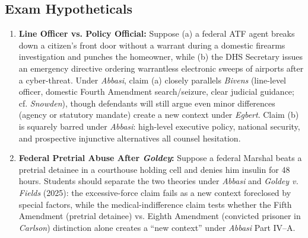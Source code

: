 \documentclass[12pt]{article}
\begin{document}
\subsection{Exam Hypotheticals}

\begin{enumerate}
  \item \textbf{Line Officer vs. Policy Official:} Suppose (a) a federal ATF agent breaks down a citizen's front door without a warrant during a domestic firearms investigation and punches the homeowner, while (b) the DHS Secretary issues an emergency directive ordering warrantless electronic sweeps of airports after a cyber-threat. Under \textit{Abbasi}, claim (a) closely parallels \textit{Bivens} (line-level officer, domestic Fourth Amendment search/seizure, clear judicial guidance; cf. \textit{Snowden}), though defendants will still argue even minor differences (agency or statutory mandate) create a new context under \textit{Egbert}. Claim (b) is squarely barred under \textit{Abbasi}: high-level executive policy, national security, and prospective injunctive alternatives all counsel hesitation.
  \item \textbf{Federal Pretrial Abuse After \textit{Goldey}:} Suppose a federal Marshal beats a pretrial detainee in a courthouse holding cell and denies him insulin for 48 hours. Students should separate the two theories under \textit{Abbasi} and \textit{Goldey v. Fields} (2025): the excessive-force claim fails as a new context foreclosed by special factors, while the medical-indifference claim tests whether the Fifth Amendment (pretrial detainee) vs. Eighth Amendment (convicted prisoner in \textit{Carlson}) distinction alone creates a ``new context'' under \textit{Abbasi} Part IV--A.
\end{enumerate}
\end{document}
